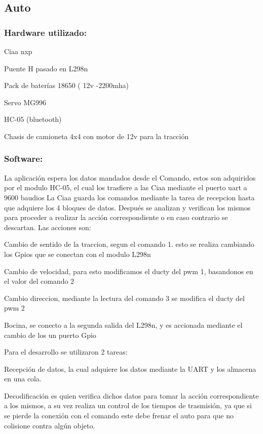 \subsection{Auto}\label{index_Auto}
\subsubsection*{Hardware utilizado\+:}


\begin{DoxyItemize}
\item Ciaa nxp
\item Puente H pasado en L298n
\item Pack de baterías 18650 ( 12v -\/2200mha)
\item Servo M\+G996
\item H\+C-\/05 (bluetooth)
\item Chasis de camioneta 4x4 con motor de 12v para la tracción
\end{DoxyItemize}

\subsubsection*{Software\+:}

La aplicación espera los datos mandados desde el Comando, estos son adquiridos por el modulo H\+C-\/05, el cual los trasfiere a las Ciaa mediante el puerto uart a 9600 baudios La Ciaa guarda los comandos mediante la tarea de recepcion hasta que adquiere los 4 bloques de datos. Después se analizan y verifican los mismos para proceder a realizar la acción correspondiente o en caso contrario se descartan. Las acciones son\+:
\begin{DoxyItemize}
\item Cambio de sentido de la traccion, segun el comando 1. esto se realiza cambiando los Gpios que se conectan con el modulo L298n
\item Cambio de velocidad, para esto modificamos el ducty del pwm 1, basandonos en el valor del comando 2
\item Cambio direccion, mediante la lectura del comando 3 se modifica el ducty del pwm 2
\item Bocina, se conecto a la segunda salida del L298n, y es accionada mediante el cambio de los un puerto Gpio
\end{DoxyItemize}



Para el desarrollo se utilizaron 2 tareas\+:
\begin{DoxyItemize}
\item Recepción de datos, la cual adquiere los datos mediante la U\+A\+RT y los almacena en una cola.
\item Decodificación es quien verifica dichos datos para tomar la acción correspondiente a los mismos, a su vez realiza un control de los tiempos de trasmisión, ya que si se pierde la conexión con el comando este debe frenar el auto para que no colisione contra algún objeto.
\end{DoxyItemize}

 